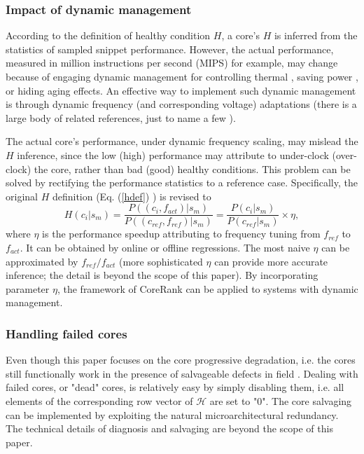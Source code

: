 \subsubsection{Impact of dynamic management}
According to the definition of healthy condition $H$, a core's $H$ is inferred from the statistics of sampled snippet performance. However, the actual performance,  measured in million instructions per second (MIPS) for example, may change because of engaging dynamic management for controlling thermal \cite{ThermalDVFS}, saving power \cite{PackCap}, or hiding aging effects\cite{ReviveNet}. An effective way to implement such dynamic management is through dynamic frequency (and corresponding voltage) adaptations (there is a large body of related references, just to name a few \cite{ReviveNet} \cite{ThermalDVFS}\cite{AgileRegulator}\cite{PackCap}).  

The actual core's performance, under dynamic  frequency scaling, may mislead the $H$ inference, since the low (high) performance may attribute to under-clock (over-clock) the core, rather than bad (good) healthy conditions. This problem can be solved by rectifying the performance statistics to a reference case.   Specifically, the original $H$ definition (Eq. (\ref{hdef}) ) is revised to
\begin{equation}
  H(c_i|s_m) = \frac{P((c_i, f_{act})|s_m)}{P((c_{ref}, f_{ref})|s_m)} =  \frac{P(c_i|s_m)}{P(c_{ref}|s_m)} \times \eta,
\end{equation}
where $\eta$ is the performance speedup attributing to frequency tuning from $f_{ref}$ to $f_{act}$. It can be obtained by online \cite{AgileRegulator}  or offline regressions.   The most naive $\eta$ can be approximated by  $ f_{ref} /f_{act}$ (more sophisticated $\eta$ can provide more accurate inference; the detail is beyond the scope of this paper).  By incorporating parameter $\eta$,  the framework of CoreRank can be applied to systems with dynamic management.  


\subsubsection{Handling failed cores}
Even though this paper focuses on the core progressive degradation, i.e. the cores still functionally work in the presence of salvageable defects in field \cite{salvaging}. Dealing with failed cores, or "dead" cores,  is relatively easy by simply disabling them, i.e. all elements of the corresponding row vector of $\mathcal{H}$ are set to "0". The core salvaging can be implemented by exploiting the natural microarchitectural redundancy. The technical details of diagnosis \cite{diagnosis}\cite{trace-based-diagnosis}\cite{mswat} and salvaging \cite{salvaging}\cite{exploiting-redundancy} are beyond the scope of this paper.

